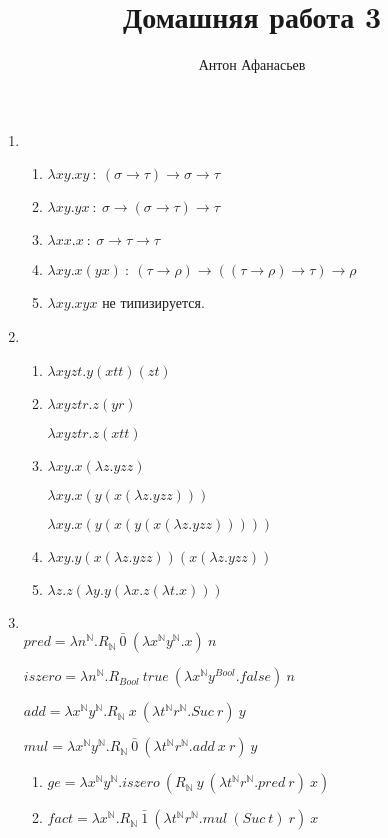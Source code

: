 \documentclass[10pt]{article}
\renewcommand{\l}{\lambda}
\newcommand{\s}{\sigma}
\newcommand{\N}{\mathbb{N}}
\begin{document}
\title{Домашняя работа 3}
\author{Антон Афанасьев}
\maketitle

\begin{enumerate}
	\item
	\begin{enumerate}
		\item $\l xy.xy\ :\ (\sigma \to \tau) \to \sigma \to \tau$
		\item $\l xy.yx\ :\ \s \to (\s \to \tau) \to \tau$
		\item $\l xx.x\ :\ \s \to \tau \to \tau$
		\item $\l xy.x(yx)\ :\ (\tau \to \rho) \to ((\tau \to \rho) \to \tau) \to \rho$
		\item $\l xy.xyx$ не типизируется.
	\end{enumerate}
	
	\item
	\begin{enumerate}
		\item $\l xyzt.y(xtt)(zt)$
		\item  $\l xyztr.z(yr)$
		
		 		$\l xyztr.z(xtt)$
		\item  $\l xy.x(\l z.yzz)$
		
				$\l xy. x(y(x(\l z.yzz)))$ 
				
				$\l xy. x(y(x(y(x(\l z.yzz)))))$
		\item $\l xy.y(x(\l z.yzz)) (x(\l z.yzz))$
		\item $\l z.z(\l y.y(\l x.z(\l t.x))) $
	\end{enumerate}
	
	\item \ \\
	$pred = \l n^\N . R_\N\ \bar 0\ (\l x^\N y^\N. x)\ n$ 
	
	$iszero = \l n^\N. R_{Bool}\ true\ (\l x^\N y^{Bool}. false)\ n$ 
	
	$add = \l x^\N y^\N. R_{\N}\ x\ (\l t^\N r^\N. Suc\ r)\ y$ 
	
	$mul = \l x^\N y^\N. R_{\N}\ \bar 0\ (\l t^\N r^\N. add\ x\ r)\ y$
	
	\begin{enumerate}
		\item $ge = \l x^\N y^\N.iszero\ (R_{\N}\ y\ (\l t^\N r^\N. pred\ r)\ x)$
		\item $fact = \l x^\N. R_{\N}\ \bar 1\ (\l t^\N r^\N. mul\ (Suc\ t)\ r)\ x$
	\end{enumerate}


\end{enumerate}
\end{document}
